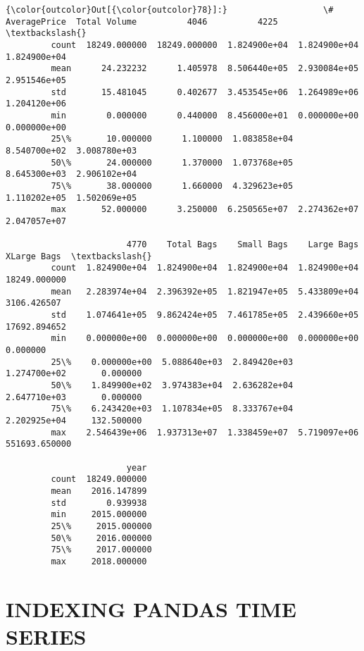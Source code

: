 \documentclass[11pt]{article}
\begin{document}
\begin{Verbatim}[commandchars=\\\{\}]
{\color{outcolor}Out[{\color{outcolor}78}]:}                   \#  AveragePrice  Total Volume          4046          4225  \textbackslash{}
         count  18249.000000  18249.000000  1.824900e+04  1.824900e+04  1.824900e+04   
         mean      24.232232      1.405978  8.506440e+05  2.930084e+05  2.951546e+05   
         std       15.481045      0.402677  3.453545e+06  1.264989e+06  1.204120e+06   
         min        0.000000      0.440000  8.456000e+01  0.000000e+00  0.000000e+00   
         25\%       10.000000      1.100000  1.083858e+04  8.540700e+02  3.008780e+03   
         50\%       24.000000      1.370000  1.073768e+05  8.645300e+03  2.906102e+04   
         75\%       38.000000      1.660000  4.329623e+05  1.110202e+05  1.502069e+05   
         max       52.000000      3.250000  6.250565e+07  2.274362e+07  2.047057e+07   
         
                        4770    Total Bags    Small Bags    Large Bags    XLarge Bags  \textbackslash{}
         count  1.824900e+04  1.824900e+04  1.824900e+04  1.824900e+04   18249.000000   
         mean   2.283974e+04  2.396392e+05  1.821947e+05  5.433809e+04    3106.426507   
         std    1.074641e+05  9.862424e+05  7.461785e+05  2.439660e+05   17692.894652   
         min    0.000000e+00  0.000000e+00  0.000000e+00  0.000000e+00       0.000000   
         25\%    0.000000e+00  5.088640e+03  2.849420e+03  1.274700e+02       0.000000   
         50\%    1.849900e+02  3.974383e+04  2.636282e+04  2.647710e+03       0.000000   
         75\%    6.243420e+03  1.107834e+05  8.333767e+04  2.202925e+04     132.500000   
         max    2.546439e+06  1.937313e+07  1.338459e+07  5.719097e+06  551693.650000   
         
                        year  
         count  18249.000000  
         mean    2016.147899  
         std        0.939938  
         min     2015.000000  
         25\%     2015.000000  
         50\%     2016.000000  
         75\%     2017.000000  
         max     2018.000000  
\end{Verbatim}
            
    \section{INDEXING PANDAS TIME SERIES}\label{indexing-pandas-time-series}
\end{document}
